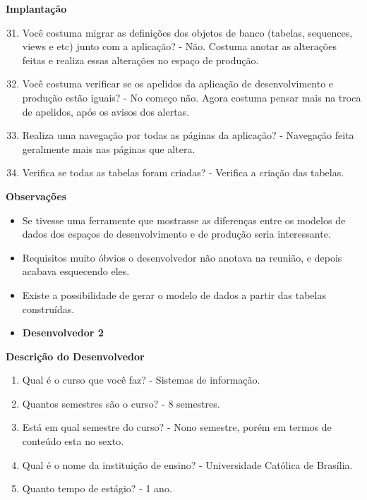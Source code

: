 \begin{apendicesenv}
\textbf{Implantação}

\begin{enumerate}
	\setcounter{enumi}{30}
	\item Você costuma migrar as definições dos objetos de banco (tabelas, sequences, views e
	etc) junto com a aplicação?\newline
	- Não. Costuma anotar as alterações feitas e realiza essas alterações no espaço de produção.
	\item Você costuma verificar se os apelidos da aplicação de desenvolvimento e produção
	estão iguais?\newline
	- No começo não. Agora costuma pensar mais na troca de apelidos, após os avisos dos alertas.
	\item Realiza uma navegação por todas as páginas da aplicação?\newline
	- Navegação feita geralmente mais nas páginas que altera.
	\item Verifica se todas as tabelas foram criadas?\newline
	- Verifica a criação das tabelas.
\end{enumerate}

\textbf{Observações}

\begin{itemize}
	\item Se tivesse uma ferramente que mostrasse as diferenças entre os modelos de dados dos espaços de desenvolvimento e de produção seria interessante.
	\item Requisitos muito óbvios o desenvolvedor não anotava na reunião, e depois acabava esquecendo eles.
	\item Existe a possibilidade de gerar o modelo de dados a partir das tabelas construídas.
\end{itemize}


\begin{itemize}
	\item \textbf{Desenvolvedor 2}
\end{itemize}

\textbf{Descrição do Desenvolvedor}

\begin{enumerate}
	\item Qual é o curso que você faz?\newline
	- Sistemas de informação.
	\item Quantos semestres são o curso?\newline
	- 8 semestres.
	\item Está em qual semestre do curso?\newline
	- Nono semestre, porém em termos de conteúdo esta no sexto.
	\item Qual é o nome da instituição de ensino?\newline
	- Universidade Católica de Brasília.
	\item Quanto tempo de estágio?\newline
	- 1 ano.
\end{enumerate}


\end{apendicesenv}
